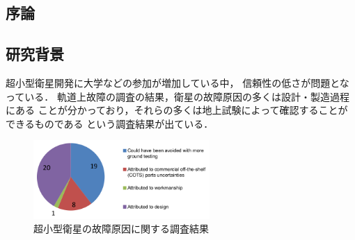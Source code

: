 \documentclass[11pt]{jsarticle}%
\begin{document}
\begin{multicols}{2}
  \section{序論}
  \vspace{-1zh}
  \subsection{研究背景}
  \vspace{-1zh}
  超小型衛星開発に大学などの参加が増加している中，
  信頼性の低さが問題となっている\cite{Langer2016}．
  軌道上故障の調査の結果，衛星の故障原因の多くは設計・製造過程にある\cite{Venturini2017}
  ことが分かっており，それらの多くは地上試験によって確認することができるものである
  という調査結果が出ている\cite{SAITO2011}．
 

  \begin{figure}[H]
    \centering
      \includegraphics[height=3.0cm]{../figure/cause_of_failure.png}
      \caption{超小型衛星の故障原因に関する調査結果\cite{Venturini2017}}
      \label{fig:cause_of_failure}
  \end{figure}
  

\end{multicols}
\end{document}
